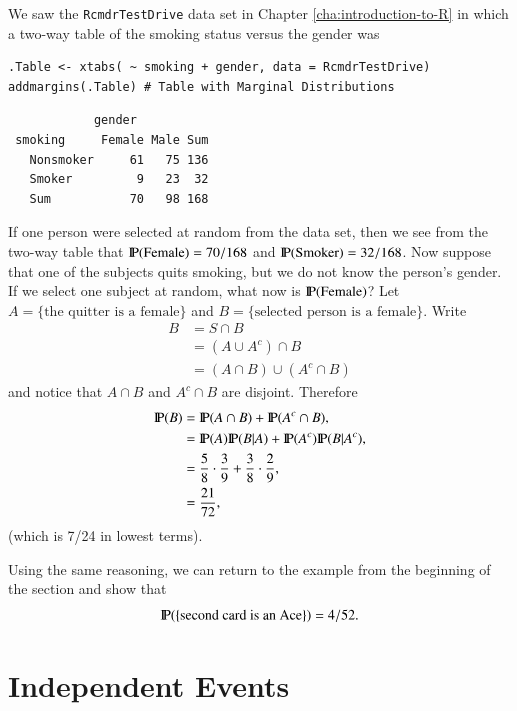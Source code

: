 \documentclass[captions=tableheading]{scrbook}
\begin{document}
\begin{example}
We saw the \texttt{RcmdrTestDrive} data set in Chapter \ref{cha:introduction-to-R} in which a two-way table of the smoking status versus the gender was 


\begin{verbatim}
.Table <- xtabs( ~ smoking + gender, data = RcmdrTestDrive)
addmargins(.Table) # Table with Marginal Distributions
\end{verbatim}

\begin{verbatim}
            gender
 smoking     Female Male Sum
   Nonsmoker     61   75 136
   Smoker         9   23  32
   Sum           70   98 168
\end{verbatim}

If one person were selected at random from the data set, then we see from the two-way table that \(\P(\mbox{Female})=70/168\) and \(\P(\mbox{Smoker})=32/168\). Now suppose that one of the subjects quits smoking, but we do not know the person's gender. If we select one subject at random, what now is \(\P(\mbox{Female})\)? Let \( A = \{ \mbox{the quitter is a female} \} \) and \( B = \{ \mbox{selected person is a female} \} \). Write
\begin{align*}
B & =S\cap B\\
 & =(A\cup A^{c})\cap B\\
 & =(A\cap B)\cup(A^{c}\cap B)
\end{align*}
and notice that \(A\cap B\) and \(A^{c}\cap B\) are disjoint. Therefore
\begin{align*}
\P(B) & =\P(A\cap B)+\P(A^{c}\cap B),\\
 & =\P(A)\P(B|A)+\P(A^{c})\P(B|A^{c}),\\
 & =\frac{5}{8}\cdot\frac{3}{9}+\frac{3}{8}\cdot\frac{2}{9},\\
 & =\frac{21}{72},
\end{align*}
(which is 7/24 in lowest terms).

\end{example}
Using the same reasoning, we can return to the example from the beginning of the section and show that
\[
\P(\{ \mbox{second card is an Ace} \} )=4/52.
\]
 
\section{Independent Events}
\label{sec-4-7}

\label{sec:Independent-Events}
\end{document}
